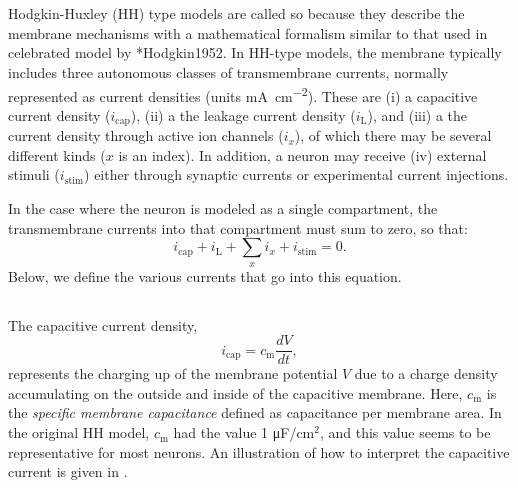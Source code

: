 \section{}
\label{sec:Neuron:membranecurrents}
Hodgkin-Huxley (HH) type models are called so because they describe the membrane mechanisms with a mathematical formalism similar to that used in celebrated model by \citeasnoun**{Hodgkin1952}. In HH-type models, the membrane typically includes three autonomous classes of transmembrane currents, normally represented as current densities (units \si{\milli\ampere\per\square\centi\metre}). These are (i) a capacitive current density ($i_{\mathrm{cap}}$), (ii) a the leakage current density ($i_{\mathrm{L}}$), and (iii) a the current density through active ion channels ($i_x$), of which there may be several different kinds ($x$ is an index). In addition, a neuron may receive (iv) external stimuli ($i_{\mathrm{stim}}$) either through synaptic currents or experimental current injections. 

In the case where the neuron is modeled as a single compartment, the transmembrane currents into that compartment must sum to zero, so that:
\begin{equation}
i_{\mathrm{cap}}+ i_{\mathrm{L}} + \sum_x{i_x} +  i_{\mathrm{stim}} = 0.
\label{eq:Neuron:singlecomp_zerosum}
\end{equation}
Below, we define the various currents that go into this equation.

\subsection{}
\label{sec:Neuron:Cap}
The capacitive current density,
\begin{equation}
i_{\mathrm{cap}}= c_{\mathrm{m}} \frac{dV}{dt},
\label{eq:Neuron:HHcap}
\end{equation}
represents the charging up of the membrane potential $V$ due to a charge density accumulating on the outside and inside of the capacitive membrane. Here, $c_{\mathrm{m}}$ is the \textit{specific membrane capacitance} defined as capacitance per membrane area. In the original HH model, $c_{\mathrm{m}}$ had the value 1 \si{\micro \farad / \cm}$^2$, and this value seems to be representative for most neurons.  An illustration of how to interpret the capacitive current is given in . 

